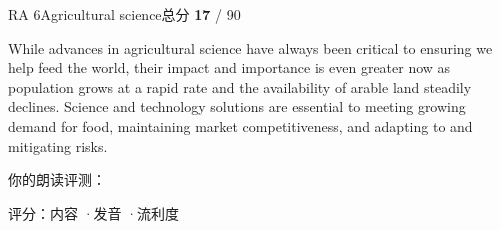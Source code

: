 \begin{qblock}{RA 6\quad Agricultural science}{总分 \textcolor{cAccent}{\bfseries 17} / 90}
\begin{promptbox}
While advances in agricultural science have always been critical to ensuring we help feed the world, their impact and importance is even greater now as population grows at a rapid rate and the availability of arable land steadily declines. Science and technology solutions are essential to meeting growing demand for food, maintaining market competitiveness, and adapting to and mitigating risks.
\end{promptbox}
\smallskip\par{\footnotesize\color{gray}你的朗读评测：}
\begin{asrbox}
    \pse {}  \pse {} \pse {}  \pse {} \pse {}  \pse {}  \pse {} \pse {}
\end{asrbox}
{\small 评分：内容 \quad·\quad 发音 \quad·\quad 流利度 }
\end{qblock}

